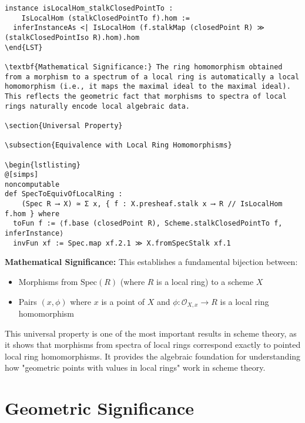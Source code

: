 \documentclass{article}
\theoremstyle{definition}
\begin{document}
\begin{lstlisting}
instance isLocalHom_stalkClosedPointTo :
    IsLocalHom (stalkClosedPointTo f).hom :=
  inferInstanceAs <| IsLocalHom (f.stalkMap (closedPoint R) ≫ (stalkClosedPointIso R).hom).hom
\end{LST}

\textbf{Mathematical Significance:} The ring homomorphism obtained from a morphism to a spectrum of a local ring is automatically a local homomorphism (i.e., it maps the maximal ideal to the maximal ideal). This reflects the geometric fact that morphisms to spectra of local rings naturally encode local algebraic data.

\section{Universal Property}

\subsection{Equivalence with Local Ring Homomorphisms}

\begin{lstlisting}
@[simps]
noncomputable
def SpecToEquivOfLocalRing :
    (Spec R ⟶ X) ≃ Σ x, { f : X.presheaf.stalk x ⟶ R // IsLocalHom f.hom } where
  toFun f := ⟨f.base (closedPoint R), Scheme.stalkClosedPointTo f, inferInstance⟩
  invFun xf := Spec.map xf.2.1 ≫ X.fromSpecStalk xf.1
\end{lstlisting}

\textbf{Mathematical Significance:} This establishes a fundamental bijection between:
\begin{itemize}
\item Morphisms from $\mathrm{Spec}(R)$ (where $R$ is a local ring) to a scheme $X$
\item Pairs $(x, \phi)$ where $x$ is a point of $X$ and $\phi: \mathcal{O}_{X,x} \to R$ is a local ring homomorphism
\end{itemize}

This universal property is one of the most important results in scheme theory, as it shows that morphisms from spectra of local rings correspond exactly to pointed local ring homomorphisms. It provides the algebraic foundation for understanding how "geometric points with values in local rings" work in scheme theory.

\section{Geometric Significance}
\end{document}
